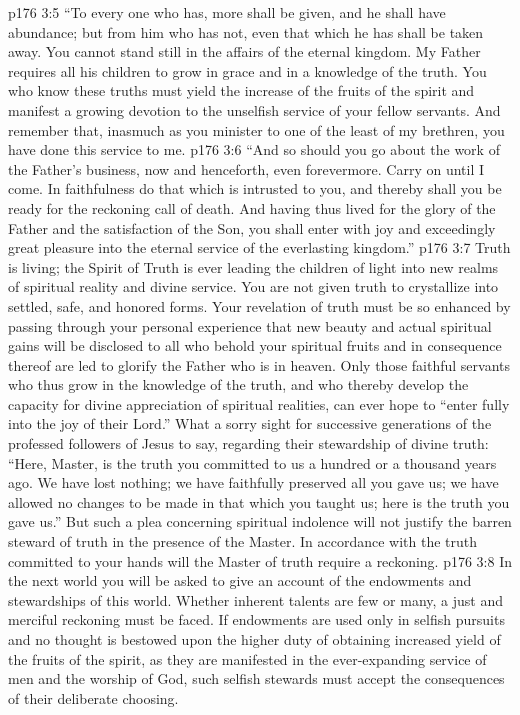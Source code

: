 \vs p176 3:5 \textcolor{ubdarkred}{“To every one who has, more shall be given, and he shall have abundance; but from him who has not, even that which he has shall be taken away. You cannot stand still in the affairs of the eternal kingdom. My Father requires all his children to grow in grace and in a knowledge of the truth. You who know these truths must yield the increase of the fruits of the spirit and manifest a growing devotion to the unselfish service of your fellow servants. And remember that, inasmuch as you minister to one of the least of my brethren, you have done this service to me.}
\vs p176 3:6 \textcolor{ubdarkred}{“And so should you go about the work of the Father’s business, now and henceforth, even forevermore. Carry on until I come. In faithfulness do that which is intrusted to you, and thereby shall you be ready for the reckoning call of death. And having thus lived for the glory of the Father and the satisfaction of the Son, you shall enter with joy and exceedingly great pleasure into the eternal service of the everlasting kingdom.”}
\pc \vs p176 3:7 Truth is living; the Spirit of Truth is ever leading the children of light into new realms of spiritual reality and divine service. You are not given truth to crystallize into settled, safe, and honored forms. Your revelation of truth must be so enhanced by passing through your personal experience that new beauty and actual spiritual gains will be disclosed to all who behold your spiritual fruits and in consequence thereof are led to glorify the Father who is in heaven. Only those faithful servants who thus grow in the knowledge of the truth, and who thereby develop the capacity for divine appreciation of spiritual realities, can ever hope to “enter fully into the joy of their Lord.” What a sorry sight for successive generations of the professed followers of Jesus to say, regarding their stewardship of divine truth: “Here, Master, is the truth you committed to us a hundred or a thousand years ago. We have lost nothing; we have faithfully preserved all you gave us; we have allowed no changes to be made in that which you taught us; here is the truth you gave us.” But such a plea concerning spiritual indolence will not justify the barren steward of truth in the presence of the Master. In accordance with the truth committed to your hands will the Master of truth require a reckoning.
\vs p176 3:8 In the next world you will be asked to give an account of the endowments and stewardships of this world. Whether inherent talents are few or many, a just and merciful reckoning must be faced. If endowments are used only in selfish pursuits and no thought is bestowed upon the higher duty of obtaining increased yield of the fruits of the spirit, as they are manifested in the ever\hyp{}expanding service of men and the worship of God, such selfish stewards must accept the consequences of their deliberate choosing.
